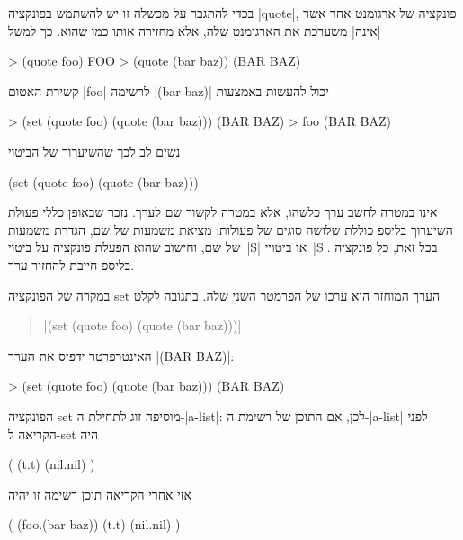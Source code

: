 בכדי להתגבר על מכשלה זו יש להשתמש בפונקציה \T|quote|, פונקציה של ארגומנט אחד
אשר \ע|אינה| משערכת את הארגומנט שלה, אלא מחזירה אותו כמו שהוא.
כך למשל
\begin{LISP}
> (quote foo)
FOO
> (quote (bar baz))
(BAR BAZ)
\end{LISP}
קשירת האטום \T|foo| לרשימה \T|(bar baz)| יכול להעשות באמצעות
\begin{LISP}
> (set (quote foo) (quote (bar baz)))
(BAR BAZ)
> foo
(BAR BAZ)
\end{LISP}
נשים לב לכך שהשיערוך של הביטוי
\begin{LISP}
(set (quote foo) (quote (bar baz)))
\end{LISP}
אינו במטרה לחשב ערך כלשהו, אלא במטרה לקשור שם לערך. נזכר שבאופן כללי פעולת
השיערוך בליספ כוללת שלושה סוגים של פעולות: מציאת משמעות של שם, הגדרת משמעות של
שם, וחישוב שהוא הפעלת פונקציה על ביטוי~\E|S| או ביטויי~\E|S|. בכל זאת, כל
פונקציה בליספ חייבת להחזיר ערך.

במקרה של הפונקציה set הערך המוחזר הוא ערכו של הפרמטר השני שלה. בתגובה לקלט
\begin{quote}
\T|(set (quote foo) (quote (bar baz)))|
\end{quote}
האינטרפרטר ידפיס את הערך \T|(BAR BAZ)|:
\begin{LISP}
> (set (quote foo) (quote (bar baz)))
(BAR BAZ)
\end{LISP}

הפונקציה set מוסיפה זוג לתחילת ה-\E|a-list|: לכן, אם התוכן של רשימת
ה-\E|a-list| לפני הקריאה ל-set היה
\begin{LISP}
(
  (t.t)
  (nil.nil)
)
\end{LISP}

\pagebreak[3]
אזי אחרי הקריאה תוכן רשימה זו יהיה
\begin{LISP}
(
  (foo.(bar baz))
  (t.t)
  (nil.nil)
)
\end{LISP}

